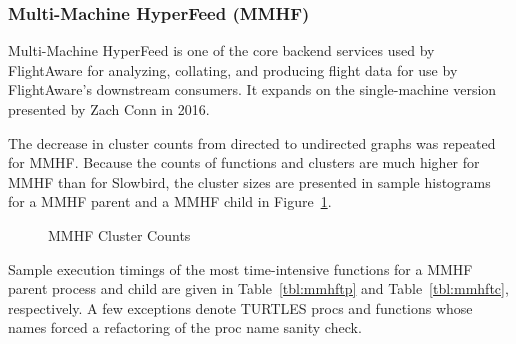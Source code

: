 \documentclass{article}[letter,10pt]
\begin{document}
{{{    }

    \subsubsection{Multi-Machine HyperFeed (MMHF)}{
      Multi-Machine HyperFeed is one of the core backend services used by FlightAware for analyzing, collating, and producing
      flight data for use by FlightAware's downstream consumers. It expands on the single-machine version presented
      by Zach Conn in 2016\autocite{hyperfeed}.

      The decrease in cluster counts from directed to undirected graphs was repeated for MMHF.
      Because the counts of functions and clusters are much higher for MMHF than for Slowbird, the cluster sizes
      are presented in sample histograms for a MMHF parent and a MMHF child in Figure~\ref{fig:mmhfhist}.

      \begin{figure}[H]
        \caption{MMHF Cluster Counts}
        \label{fig:mmhfhist}
      \end{figure}

      Sample execution timings of the most time-intensive functions for a MMHF parent process and child are given in Table~\ref{tbl:mmhftp}
      and Table~\ref{tbl:mmhftc}, respectively. A few exceptions denote
      TURTLES procs and functions whose names forced a refactoring of the proc name sanity check.


}}}
\end{document}
